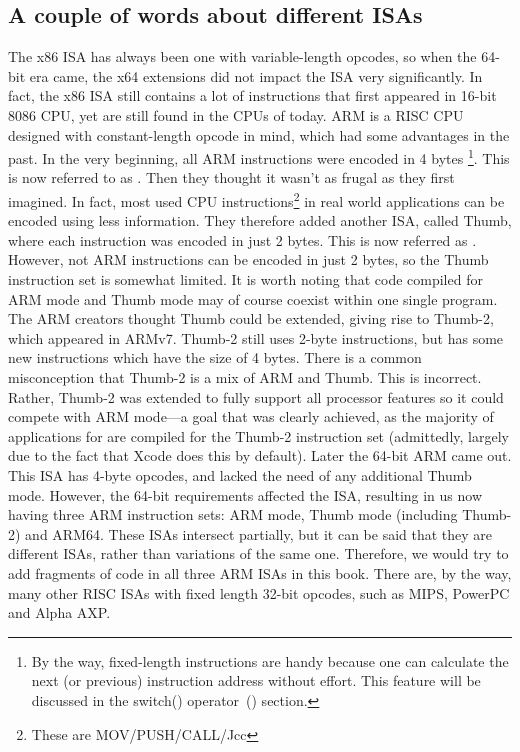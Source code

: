 \ifx\LITE\undefined
{}%
%
%

\subsection{A couple of words about different \ac{ISA}s}
The x86 \ac{ISA} has always been one with variable-length opcodes, so when the 64-bit era came, the x64 extensions did not impact the \ac{ISA} very significantly. In fact, the x86 \ac{ISA} still contains a lot of instructions that first appeared in 16-bit 8086 CPU, yet are still found in the CPUs of today.
ARM is a \ac{RISC} \ac{CPU} designed with constant-length opcode in mind, which had some advantages in the past.
In the very beginning, all ARM instructions were encoded in 4 bytes%
\footnote{
By the way, fixed-length instructions are handy because one can calculate the next (or previous) 
instruction address without effort. This feature will be discussed in the switch() operator~() section.
}.
This is now referred to as .
Then they thought it wasn't as frugal as they first imagined.
In fact, most used \ac{CPU} instructions\footnote{These are MOV/PUSH/CALL/Jcc} in real world applications can be encoded using less information.
They therefore added another \ac{ISA}, called Thumb, where each instruction was encoded in just 2 bytes.
This is now referred as .
However, not  ARM instructions can be encoded in just 2 bytes, so the Thumb instruction set is somewhat limited.
It is worth noting that code compiled for ARM mode and Thumb mode may of course coexist within one single program.
The ARM creators thought Thumb could be extended, giving rise to Thumb-2, which appeared in ARMv7.
Thumb-2 still uses 2-byte instructions, but has some new instructions which have the size of 4 bytes.
There is a common misconception that Thumb-2 is a mix of ARM and Thumb. This is incorrect. 
Rather, Thumb-2 was extended to fully support all processor features so it could
compete with ARM mode---a goal that was clearly achieved, as the majority of applications for \idevices are compiled for the Thumb-2 instruction set (admittedly, largely due to the fact that Xcode does this by default).
Later the 64-bit ARM came out. This \ac{ISA} has 4-byte opcodes, and lacked the need of any additional Thumb mode.
However, the 64-bit requirements affected the \ac{ISA}, resulting in us now having three ARM instruction sets: ARM mode, Thumb mode (including Thumb-2) and ARM64.
These \ac{ISA}s intersect partially, but it can be said that they are different \ac{ISA}s, rather than variations of the same one.
Therefore, we would try to add fragments of code in all three ARM \ac{ISA}s in this book.
%
%
%
There are, by the way, many other \ac{RISC} \ac{ISA}s with fixed length 32-bit opcodes, such as MIPS, PowerPC and Alpha AXP.
\fi %
